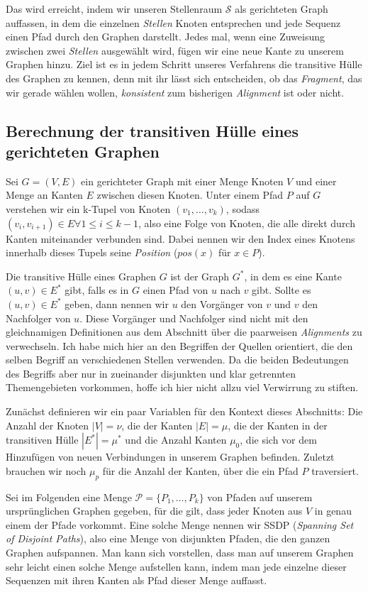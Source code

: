 Das wird erreicht, indem wir unseren Stellenraum $\mathcal{S}$ als gerichteten Graph auffassen, in dem die einzelnen \emph{Stellen} Knoten entsprechen und jede Sequenz einen Pfad durch den Graphen darstellt. Jedes mal, wenn eine Zuweisung zwischen zwei \emph{Stellen} ausgewählt wird, fügen wir eine neue Kante zu unserem Graphen hinzu. Ziel ist es in jedem Schritt unseres Verfahrens die transitive Hülle des Graphen zu kennen, denn mit ihr lässt sich entscheiden, ob das \emph{Fragment}, das wir gerade wählen wollen, \emph{konsistent} zum bisherigen \emph{Alignment} ist oder nicht.

\subsection{Berechnung der transitiven Hülle eines gerichteten Graphen}

Sei $G=(V,E)$ ein gerichteter Graph mit einer Menge Knoten $V$ und einer Menge an Kanten $E$ zwischen diesen Knoten. Unter einem Pfad $P$ auf $G$ verstehen wir ein k-Tupel von Knoten $(v_1, \dots, v_k)$, sodass $(v_i, v_{i+1}) \in E \forall 1 \leq i \leq k-1$, also eine Folge von Knoten, die alle direkt durch Kanten miteinander verbunden sind. Dabei nennen wir den Index eines Knotens innerhalb dieses Tupels seine \emph{Position} ($pos(x)$ für $x \in P$).

Die transitive Hülle eines Graphen $G$ ist der Graph $G^*$, in dem es eine Kante $(u,v) \in E^*$ gibt, falls es in $G$ einen Pfad von $u$ nach $v$ gibt. Sollte es $(u,v) \in E^*$ geben, dann nennen wir $u$ den Vorgänger von $v$ und $v$ den Nachfolger von $u$. Diese Vorgänger und Nachfolger sind nicht mit den gleichnamigen Definitionen aus dem Abschnitt über die paarweisen \emph{Alignments} zu verwechseln. Ich habe mich hier an den Begriffen der Quellen orientiert, die den selben Begriff an verschiedenen Stellen verwenden. Da die beiden Bedeutungen des Begriffs aber nur in zueinander disjunkten und klar getrennten Themengebieten vorkommen, hoffe ich hier nicht allzu viel Verwirrung zu stiften. 

Zunächst definieren wir ein paar Variablen für den Kontext dieses Abschnitts: Die Anzahl der Knoten $|V| = \nu$, die der Kanten $|E| = \mu$, die der Kanten in der transitiven Hülle $|E^*| = \mu^*$ und die Anzahl Kanten $\mu_0$, die sich vor dem Hinzufügen von neuen Verbindungen in unserem Graphen befinden. Zuletzt brauchen wir noch $\mu_p$ für die Anzahl der Kanten, über die ein Pfad $P$ traversiert.

Sei im Folgenden eine Menge $\mathcal{P} = \{P_1, \dots, P_k\}$ von Pfaden auf unserem ursprünglichen Graphen gegeben, für die gilt, dass jeder Knoten aus $V$ in genau einem der Pfade vorkommt. Eine solche Menge nennen wir SSDP (\emph{Spanning Set of Disjoint Paths}), also eine Menge von disjunkten Pfaden, die den ganzen Graphen aufspannen. Man kann sich vorstellen, dass man auf unserem Graphen sehr leicht einen solche Menge aufstellen kann, indem man jede einzelne dieser Sequenzen mit ihren Kanten als Pfad dieser Menge auffasst. 

